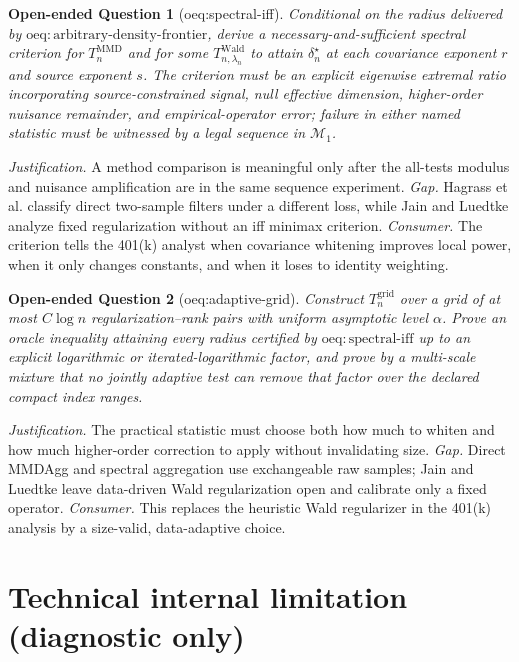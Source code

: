\documentclass{article}
\newtheorem{openendedquestion}{Open-ended Question}
\begin{document}
\begin{openendedquestion}[oeq:spectral-iff]\label{oeq:spectral-iff}
Conditional on the radius delivered by \(\mathrm{oeq{:}arbitrary\mbox{-}density\mbox{-}frontier}\), derive a necessary-and-sufficient spectral criterion for \(T_n^{\mathrm{MMD}}\) and for some \(T_{n,\lambda_n}^{\mathrm{Wald}}\) to attain \(\delta_n^\star\) at each covariance exponent \(r\) and source exponent \(s\). The criterion must be an explicit eigenwise extremal ratio incorporating source-constrained signal, null effective dimension, higher-order nuisance remainder, and empirical-operator error; failure in either named statistic must be witnessed by a legal sequence in \(\mathcal M_1\).
\end{openendedquestion}
\par\smallskip\noindent \textit{Justification.} A method comparison is meaningful only after the all-tests modulus and nuisance amplification are in the same sequence experiment. \textit{Gap.} Hagrass et al. classify direct two-sample filters under a different loss, while Jain and Luedtke analyze fixed regularization without an iff minimax criterion. \textit{Consumer.} The criterion tells the 401(k) analyst when covariance whitening improves local power, when it only changes constants, and when it loses to identity weighting.

\begin{openendedquestion}[oeq:adaptive-grid]\label{oeq:adaptive-grid}
Construct \(T_n^{\mathrm{grid}}\) over a grid of at most \(C\log n\) regularization--rank pairs with uniform asymptotic level \(\alpha\). Prove an oracle inequality attaining every radius certified by \(\mathrm{oeq{:}spectral\mbox{-}iff}\) up to an explicit logarithmic or iterated-logarithmic factor, and prove by a multi-scale mixture that no jointly adaptive test can remove that factor over the declared compact index ranges.
\end{openendedquestion}
\par\smallskip\noindent \textit{Justification.} The practical statistic must choose both how much to whiten and how much higher-order correction to apply without invalidating size. \textit{Gap.} Direct MMDAgg and spectral aggregation use exchangeable raw samples; Jain and Luedtke leave data-driven Wald regularization open and calibrate only a fixed operator. \textit{Consumer.} This replaces the heuristic Wald regularizer in the 401(k) analysis by a size-valid, data-adaptive choice.

\section*{Technical internal limitation (diagnostic only)}
\end{document}
